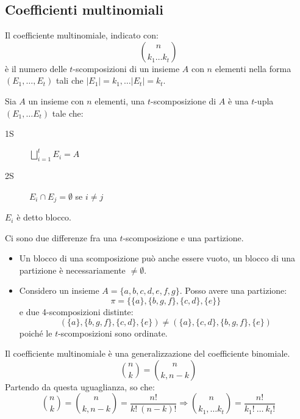 \subsection{Coefficienti multinomiali}

Il coefficiente multinomiale, indicato con:
\[
\binom{n}{k_1 \dots k_t}
\]
\`e il numero delle $t$-scomposizioni di un insieme $A$ con $n$ elementi nella forma $(E_1, \dots, E_t)$ tali che $|E_1| = k_1, \dots |E_t| = k_t$.

\begin{defn}[$t$-scomposizioni]
Sia $A$ un insieme con $n$ elementi, una $t$-scomposizione di $A$ \`e una $t$-upla $(E_1, \dots E_t)$ tale che:
\begin{description}
  \item[1S] $\bigsqcup_{i = 1}^{t} E_i = A$
  \item[2S] $E_i \cap E_j = \emptyset$ se $i \neq j$ 
\end{description}
$E_i$ \`e detto blocco.
\end{defn}
Ci sono due differenze fra una $t$-scomposizione e una partizione.
\begin{itemize}
  \item Un blocco di una scomposizione pu\`o anche essere vuoto, un blocco di una partizione \`e necessariamente $\neq \emptyset$.
  \item Considero un insieme $A = \{ a, b, c, d, e, f, g\}$. Posso avere una partizione:
  \[
  \pi = \{ \{a\}, \{b, g, f\}, \{c, d\}, \{e\} \}
  \]
  e due 4-scomposizioni distinte:
  \[
  (\{a\}, \{b, g, f\}, \{c, d\}, \{e\}) \neq 
  (\{a\}, \{c, d\}, \{b, g, f\}, \{e\})
  \]
  poich\'e le $t$-scomposizioni sono ordinate.
\end{itemize} 

Il coefficiente multinomiale \`e una generalizzazione del coefficiente binomiale.
\[
\binom{n}{k} = \binom{n}{k, n-k}
\]
Partendo da questa uguaglianza, so che:
\[
\binom{n}{k} = \binom{n}{k, n-k} = \frac{n!}{k! \ (n - k)!}
\Rightarrow
\binom{n}{k_1, \dots k_t} = \frac{n!}{k_1! \ \dots \ k_t!}
\]

